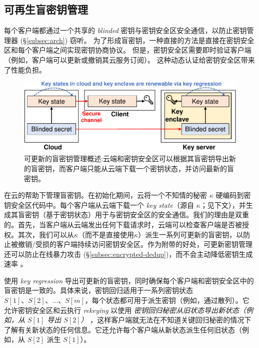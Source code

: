 \subsection{可再生盲密钥管理}
\label{subsec:key-management}

每个客户端都通过一个共享的 \textit{ blinded} 密钥与密钥安全区安全通信，以防止密钥管理器 (\S\ref{subsec:arch}) 窃听。 为了形成盲密钥，一种直接的方法是直接在密钥安全区和每个客户端之间实现密钥协商协议。 但是，密钥安全区需要即时验证客户端（例如，客户端可以更新或撤销其云服务订阅）。 这种动态认证给密钥安全区带来了性能负担。


\begin{figure}[t]
\centering
\includegraphics[width=\textwidth]{pic/sgxdedup/blindkey.pdf}
\vspace{-16pt}
\caption{可更新的盲密钥管理概述:云端和密钥安全区可以根据其盲密钥导出新的盲密钥，而客户端只能从云端下载一个密钥状态，并访问最新的盲密钥。}
\label{fig:keymanage}
\end{figure}

\sysnameS 在云的帮助下管理盲密钥。在初始化期间，云将一个不知情的秘密 $\kappa$ 硬编码到密钥安全区代码中。每个客户端从云端下载一个 \textit{ key state}（源自 $\kappa$；见下文），并生成其盲密钥（基于密钥状态）用于与密钥安全区的安全通信。我们的理由是双重的。首先，当客户端从云端发出任何下载请求时，云端可以检查客户端是否被授权。其次，我们可以从$\kappa$（而不是直接使用$\kappa$）派生一系列可更新的盲密钥，以防止被撤销/受损的客户端持续访问密钥安全区。作为附带的好处，可更新密钥管理还可以防止在线暴力攻击 (\S\ref{subsec:encrypted-dedup})，而不会主动降低密钥生成速率 \cite{bellare13b}。

\sysnameS 使用 \textit{ key regression} \cite{fu06} 导出可更新的盲密钥，同时确保每个客户端和密钥安全区中的盲密钥是一致的。具体来说，密钥回归适用于一系列密钥状态 $S[1]、S[2]、\ldots、S[m]$，每个状态都可用于派生密钥（例如，通过散列）。它允许密钥安全区和云执行 \textit{ rekeying} 以使用 \textit{ 密钥回归秘密从旧状态导出新状态（例如，从 $S[1]$ 导出 $S[2]$） }，这样客户端就无法在不知道关键回归秘密的情况下了解有关新状态的任何信息。它还允许每个客户端从新状态派生任何旧状态（例如，从 $S[2]$ 派生 $S[1]$）。

